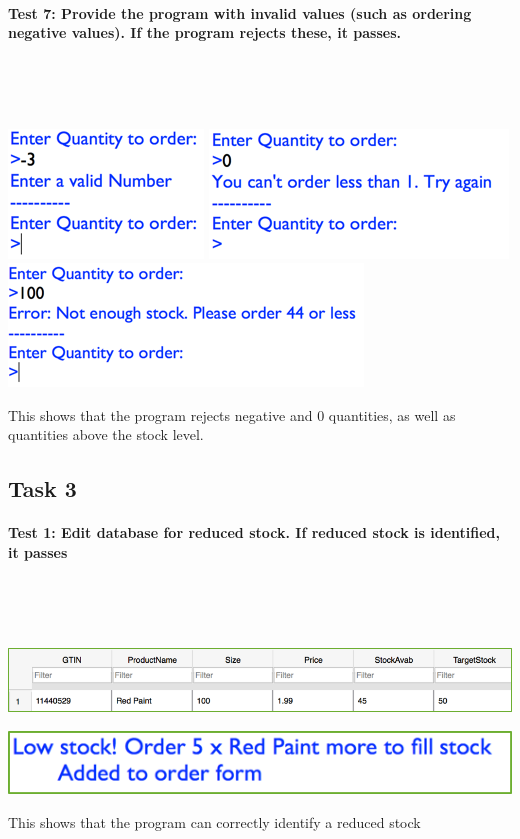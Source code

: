 \documentclass[a4paper]{article}
\begin{document}
\paragraph{Test 7: Provide the program with invalid values (such as ordering negative values). If the program rejects these, it passes.} ~\par ~\par
\noindent\includegraphics{testing_15.png}
\noindent\includegraphics{testing_16.png}
\noindent\includegraphics{testing_17.png} \par
This shows that the program rejects negative and 0 quantities, as well as quantities above the stock level. 
\newpage
\subsection{Task 3}
\paragraph{Test 1: Edit database for reduced stock. If reduced stock is identified, it passes} ~\par ~\par
\noindent\includegraphics{testing_19.png} \par
\noindent\includegraphics{testing_20.png} \par
This shows that the program can correctly identify a reduced stock
\end{document}
